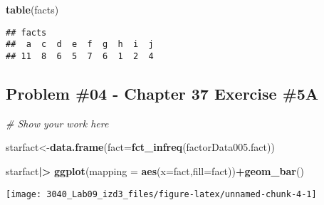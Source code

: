 \documentclass[
]{article}
\newenvironment{Shaded}{\begin{snugshade}}{\end{snugshade}}
\newcommand{\AttributeTok}[1]{\textcolor[rgb]{0.13,0.29,0.53}{#1}}
\newcommand{\CommentTok}[1]{\textcolor[rgb]{0.56,0.35,0.01}{\textit{#1}}}
\newcommand{\FunctionTok}[1]{\textcolor[rgb]{0.13,0.29,0.53}{\textbf{#1}}}
\newcommand{\NormalTok}[1]{#1}
\newcommand{\OtherTok}[1]{\textcolor[rgb]{0.56,0.35,0.01}{#1}}
\newcommand{\SpecialCharTok}[1]{\textcolor[rgb]{0.81,0.36,0.00}{\textbf{#1}}}
\begin{document}
\begin{Shaded}
\begin{Highlighting}[]
\FunctionTok{table}\NormalTok{(facts)}
\end{Highlighting}
\end{Shaded}

\begin{verbatim}
## facts
##  a  c  d  e  f  g  h  i  j 
## 11  8  6  5  7  6  1  2  4
\end{verbatim}

\newpage

\hypertarget{problem-04---chapter-37-exercise-5a}{%
\subsection{Problem \#04 - Chapter 37 Exercise
\#5A}\label{problem-04---chapter-37-exercise-5a}}

\begin{Shaded}
\begin{Highlighting}[]
\CommentTok{\# Show your work here}

\NormalTok{starfact}\OtherTok{\textless{}{-}}\FunctionTok{data.frame}\NormalTok{(}\AttributeTok{fact=}\FunctionTok{fct\_infreq}\NormalTok{(factorData005.fact))}

\NormalTok{starfact}\SpecialCharTok{|\textgreater{}}
  \FunctionTok{ggplot}\NormalTok{(}\AttributeTok{mapping =} \FunctionTok{aes}\NormalTok{(}\AttributeTok{x=}\NormalTok{fact,}\AttributeTok{fill=}\NormalTok{fact))}\SpecialCharTok{+}\FunctionTok{geom\_bar}\NormalTok{()}
\end{Highlighting}
\end{Shaded}

\texttt{[image: 3040\_Lab09\_izd3\_files/figure-latex/unnamed-chunk-4-1]}
\end{document}
